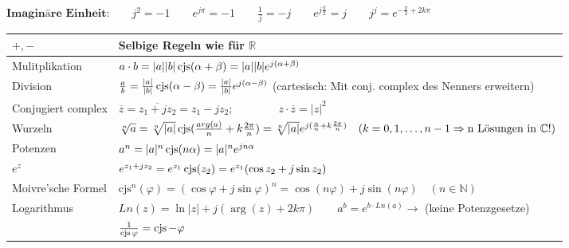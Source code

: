 $\textbf{Imaginäre Einheit:} \qquad j^2 = -1 \qquad e^{j\pi} = -1 \qquad \frac{1}{j} = -j \qquad e^{j\frac{\pi}{2}}= j \qquad j^j = e^{-\frac{\pi}{2}+2k\pi}$


\renewcommand{\arraystretch}{1.5}
\begin{tabular}{| l | l |}
\hline
	$+, -$
	& Selbige Regeln wie für $\mathbb{R}$\\

\hline
	Mulitplikation
	&$a \cdot b = 
		|a| |b| \operatorname{cjs}(\alpha + \beta) = 
		|a| |b| e^{j(\alpha + \beta)}$\\

\hline
	Division
	&$\frac{a}{b} = 
		\frac{\left|a\right|}{\left|b\right|} \operatorname{cjs}(\alpha - \beta) =
		\frac{\left|a\right|}{\left|b\right|} e^{j(\alpha - \beta)}$ (cartesisch: Mit
		conj. complex des Nenners erweitern) \\

\hline
	Conjugiert complex
	&$\overline{z} = \overline{z_1 + jz_2} = z_1 - jz_2; \qquad \qquad z \cdot \overline{z} = |z|^2$\\

\hline
	Wurzeln
	&$\sqrt[n]{a} = \sqrt[n]{|a|} \operatorname{cjs}(\frac{arg(a)}{n}+k\frac{2\pi}{n}) = 
	\sqrt[n]{|a|} e^{j(\frac{\alpha}{n} + k \frac{2\pi}{n})} \quad (k = 0, 1,
	\ldots, n-1 \Rightarrow \text{n Lösungen in } \mathbb{C} !)$ \\

\hline
	Potenzen
	&$a^n = |a|^n \operatorname{cjs}(n\alpha) = 
	|a|^n e^{jn\alpha}$\\

\hline
	$e^z$ &$e^{z_1+jz_2} = e^{z_1} \operatorname{cjs}(z_2) = e^{z_1} (\cos{z_2} + j\sin{z_2})$\\

\hline
	Moivre'sche Formel
	&$\text{cjs}^n(\varphi) =
	(\cos{\varphi} + j\sin{\varphi})^n = 
	\cos(n\varphi) +j\sin(n\varphi) \quad (n \in \mathbb{N})$\\

\hline
	Logarithmus
	&$Ln(z) = \ln{|z|} + j (\arg(z) + 2k \pi) \qquad a^b = e^{b\cdot Ln(a)} \rightarrow$ (keine Potenzgesetze) \\

\hline
	& $\frac{1}{\operatorname{cjs}{\varphi}} = \operatorname{cjs}{-\varphi}$ \\
\hline
\end{tabular}
\renewcommand{\arraystretch}{1}\\

